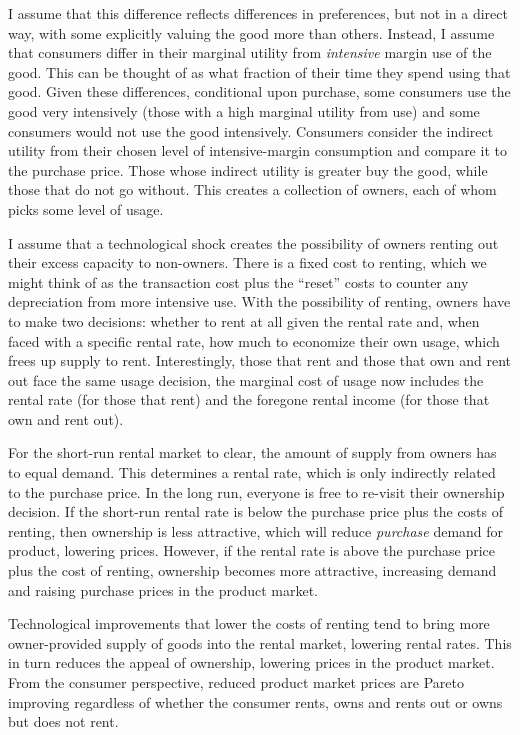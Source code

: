 \documentclass[11pt]{article}
\begin{document}
I assume that this difference reflects differences in preferences, but not in a direct way, with some explicitly valuing the good more than others. 
Instead, I assume that consumers differ in their marginal utility from \emph{intensive} margin use of the good.
This can be thought of as what fraction of their time they spend using that good.  
Given these differences, conditional upon purchase, some consumers use the good very intensively (those with a high marginal utility from use) and some consumers would not use the good intensively. 
Consumers consider the indirect utility from their chosen level of intensive-margin consumption and compare it to the purchase price. 
Those whose indirect utility is greater buy the good, while those that do not go without.  
This creates a collection of owners, each of whom picks some level of usage. 

I assume that a technological shock creates the possibility of owners renting out their excess capacity to non-owners. 
There is a fixed cost to renting, which we might think of as the transaction cost plus the ``reset'' costs to counter any depreciation from more intensive use. 
With the possibility of renting, owners have to make two decisions: whether to rent at all given the rental rate and, when faced with a specific rental rate, how much to economize their own usage, which frees up supply to rent. 
Interestingly, those that rent and those that own and rent out face the same usage decision, the marginal cost of usage now includes the rental rate (for those that rent) and the foregone rental income (for those that own and rent out). 

For the short-run rental market to clear, the amount of supply from owners has to equal demand. 
This determines a rental rate, which is only indirectly related to the purchase price. 
In the long run, everyone is free to re-visit their ownership decision. 
If the short-run rental rate is below the purchase price plus the costs of renting, then ownership is less attractive, which will reduce \emph{purchase} demand for product, lowering prices. 
However, if the rental rate is above the purchase price plus the cost of renting, ownership becomes more attractive, increasing demand and raising purchase prices in the product market. 

Technological improvements that lower the costs of renting tend to bring more owner-provided supply of goods into the rental market, lowering rental rates. 
This in turn reduces the appeal of ownership, lowering prices in the product market. 
From the consumer perspective, reduced product market prices are Pareto improving regardless of whether the consumer rents, owns and rents out or owns but does not rent. 
\end{document}
